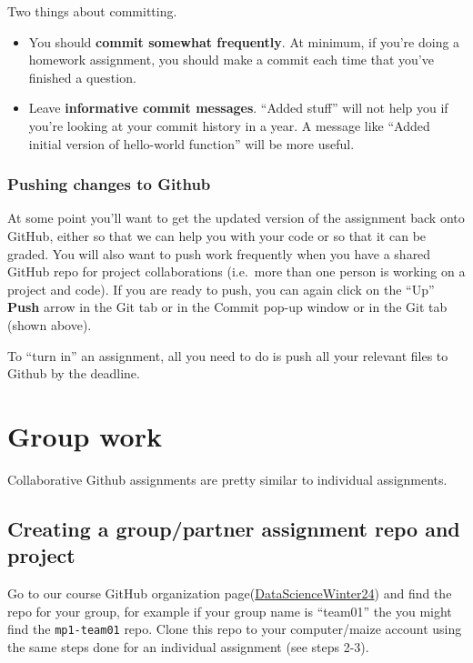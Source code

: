 \documentclass[
]{book}
\providecommand{\tightlist}{%
  \setlength{\itemsep}{0pt}\setlength{\parskip}{0pt}}
\begin{document}
Two things about committing.

\begin{itemize}
\tightlist
\item
  You should \textbf{commit somewhat frequently}. At minimum, if you're
  doing a homework assignment, you should make a commit each time that
  you've finished a question.
\item
  Leave \textbf{informative commit messages}. ``Added stuff'' will not help
  you if you're looking at your commit history in a year. A message
  like ``Added initial version of hello-world function'' will be more
  useful.
\end{itemize}

\hypertarget{pushing-changes-to-github}{%
\subsubsection{Pushing changes to Github}\label{pushing-changes-to-github}}

At some point you'll want to get the updated version of the assignment
back onto GitHub, either so that we can help you with your code or so
that it can be graded. You will also want to push work frequently when
you have a shared GitHub repo for project collaborations (i.e.~more than
one person is working on a project and code). If you are ready to push,
you can again click on the ``Up'' \textbf{Push} arrow in the Git tab or in the
Commit pop-up window or in the Git tab (shown above).

To ``turn in'' an assignment, all you need to do is push all your relevant
files to Github by the deadline.

\hypertarget{group-work}{%
\section{Group work}\label{group-work}}

Collaborative Github assignments are pretty similar to individual assignments.

\hypertarget{creating-a-grouppartner-assignment-repo-and-project}{%
\subsection{Creating a group/partner assignment repo and project}\label{creating-a-grouppartner-assignment-repo-and-project}}

Go to our course GitHub organization page(\href{https://github.com/DataScienceWinter24}{DataScienceWinter24}) and find the repo for your group, for example if your group name is ``team01'' the you might find the \texttt{mp1-team01} repo. Clone this repo to your computer/maize account using the same steps done for an individual assignment (see steps 2-3).
\end{document}
